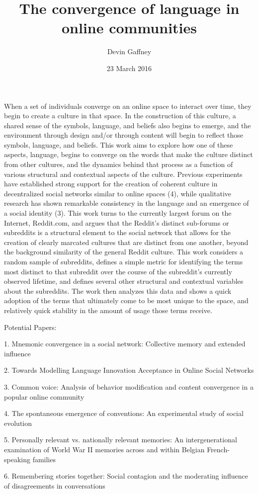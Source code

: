 \documentclass[letterpaper,12pt]{article}
\title{The convergence of language in online communities}
\date{23 March 2016}
\author{Devin Gaffney}
\begin{document}
\maketitle

\onehalfspacing
\smallskip

When a set of individuals converge on an online space to interact over time, they begin to create a culture in that space. In the construction of this culture, a shared sense of the symbols, language, and beliefs also begins to emerge, and the environment through design and/or through content will begin to reflect those symbols, language, and beliefs. This work aims to explore how one of these aspects, language, begins to converge on the words that make the culture distinct from other cultures, and the dynamics behind that process as a function of various structural and contextual aspects of the culture. Previous experiments have established strong support for the creation of coherent culture in decentralized social networks similar to online spaces (4), while qualitative research has shown remarkable consistency in the language and an emergence of a social identity (3). This work turns to the currently largest forum on the Internet, Reddit.com, and argues that the Reddit's distinct sub-forums or subreddits is a structural element to the social network that allows for the creation of clearly marcated cultures that are distinct from one another, beyond the background similarity of the general Reddit culture. This work considers a random sample of subreddits, defines a simple metric for identifying the terms most distinct to that subreddit over the course of the subreddit's currently observed lifetime, and defines several other structural and contextual variables about the subreddits. The work then analyzes this data and shows a quick adoption of the terms that ultimately come to be most unique to the space, and relatively quick stability in the amount of usage those terms receive.

\scriptsize
Potential Papers:

1. Mnemonic convergence in a social network: Collective memory and extended influence

2. Towards Modelling Language Innovation Acceptance in Online Social Networks

3. Common voice: Analysis of behavior modification and content convergence in a popular online community

4. The spontaneous emergence of conventions: An experimental study of social evolution

5. Personally relevant vs. nationally relevant memories: An intergenerational examination of World War II memories across and within Belgian French-speaking families

6. Remembering stories together: Social contagion and the moderating influence of disagreements in conversations
\end{document}
